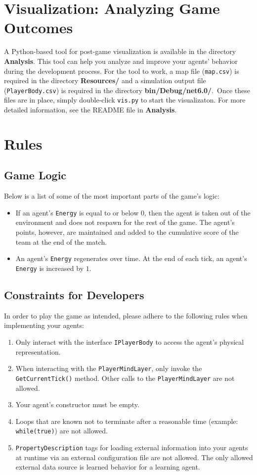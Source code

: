 \documentclass[
  a4paper,
  english,
  DIV=16,
  11pt,
  parskip=half,
  dvipsnames,
  listof=totoc,		     %
  index=totoc,		     %
  bibliography=totoc,	 %
]{scrartcl}
\newcommand\todo[1]{\textcolor{red}{#1}}
\begin{document}
\section{Visualization: Analyzing Game Outcomes} \label{sec:vis}
%
A Python-based tool for post-game visualization is available in the directory \textbf{Analysis}. This tool can help you analyze and improve your agents' behavior during the development process. For the tool to work, a map file (\texttt{map.csv}) is required in the directory \textbf{Resources/} and a simulation output file (\texttt{PlayerBody.csv}) is required in the directory \textbf{bin/Debug/net6.0/}.~Once these files are in place, simply double-click \texttt{vis.py} to start the visualizaton. For more detailed information, see the README file in \textbf{Analysis}.
%
%
\section{Rules} \label{sec:rules}
%
\subsection{Game Logic}
Below is a list of some of the most important parts of the game's logic:
%
\begin{itemize}
  \item If an agent's \texttt{Energy} is equal to or below 0, then the agent is taken out of the environment and does not respawn for the rest of the game. The agent's points, however, are maintained and added to the cumulative score of the team at the end of the match.
  \item An agent's \texttt{Energy} regenerates over time. At the end of each tick, an agent's \texttt{Energy} is increased by $1$.
\end{itemize}
%
\subsection{Constraints for Developers}
In order to play the game as intended, please adhere to the following rules when implementing your agents:
\begin{enumerate}
  \item Only interact with the interface \texttt{IPlayerBody} to access the agent's physical representation.
  \item When interacting with the \texttt{PlayerMindLayer}, only invoke the \texttt{GetCurrentTick()} method. Other calls to the \texttt{PlayerMindLayer} are not allowed.
  \item Your agent's constructor must be empty. %
  \item Loops that are known not to terminate after a reasonable time (example: \texttt{while(true)}) are not allowed.
  \item \texttt{PropertyDescription} tags for loading external information into your agents at runtime via an external configuration file are not allowed. The only allowed external data source is learned behavior for a learning agent.
\end{enumerate}
%
\end{document}
